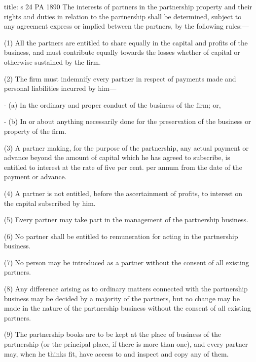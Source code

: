 \documentclass[
]{article}
\newenvironment{Shaded}{}{}
\newcommand{\NormalTok}[1]{#1}
\begin{document}
\begin{Shaded}
\begin{Highlighting}[]
\NormalTok{title: s 24 PA 1890}
\NormalTok{The interests of partners in the partnership property and their rights and duties in relation to the partnership shall be determined, subject to any agreement express or implied between the partners, by the following rules:—}

\NormalTok{(1) All the partners are entitled to share equally in the capital and profits of the business, and must contribute equally towards the losses whether of capital or otherwise sustained by the firm.}

\NormalTok{(2) The firm must indemnify every partner in respect of payments made and personal liabilities incurred by him—}

\NormalTok{{-} (a) In the ordinary and proper conduct of the business of the firm; or,}

\NormalTok{{-} (b) In or about anything necessarily done for the preservation of the business or property of the firm.}

\NormalTok{(3) A partner making, for the purpose of the partnership, any actual payment or advance beyond the amount of capital which he has agreed to subscribe, is entitled to interest at the rate of five per cent. per annum from the date of the payment or advance.}

\NormalTok{(4) A partner is not entitled, before the ascertainment of profits, to interest on the capital subscribed by him.}

\NormalTok{(5) Every partner may take part in the management of the partnership business.}

\NormalTok{(6) No partner shall be entitled to remuneration for acting in the partnership business.}

\NormalTok{(7) No person may be introduced as a partner without the consent of all existing partners.}

\NormalTok{(8) Any difference arising as to ordinary matters connected with the partnership business may be decided by a majority of the partners, but no change may be made in the nature of the partnership business without the consent of all existing partners.}

\NormalTok{(9) The partnership books are to be kept at the place of business of the partnership (or the principal place, if there is more than one), and every partner may, when he thinks fit, have access to and inspect and copy any of them.}
\end{Highlighting}
\end{Shaded}
\end{document}
